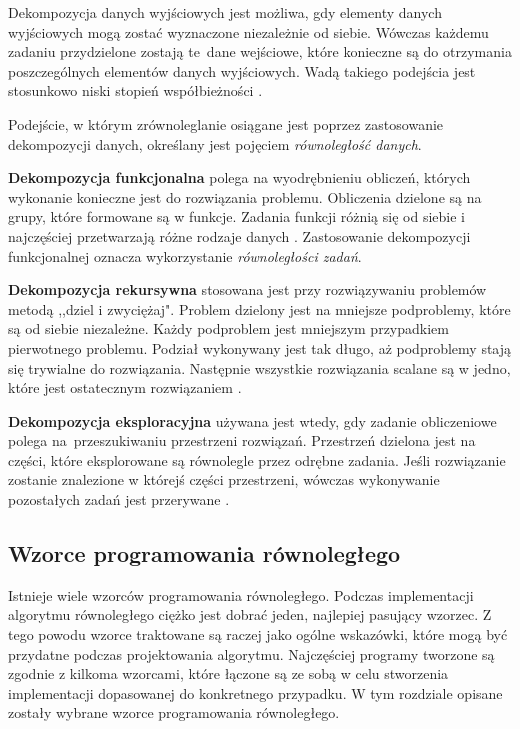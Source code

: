 \documentclass[12pt]{article}
\begin{document}
Dekompozycja danych wyjściowych jest możliwa, gdy elementy danych wyjściowych mogą zostać wyznaczone niezależnie od siebie.
Wówczas każdemu zadaniu przydzielone zostają te~dane wejściowe, które konieczne są do otrzymania poszczególnych elementów
danych wyjściowych. Wadą takiego podejścia jest stosunkowo niski stopień współbieżności \cite{wprowadzenie-do-obliczen-rownoleglych}.

Podejście, w którym zrównoleglanie osiągane jest poprzez zastosowanie dekompozycji danych, określany jest pojęciem
\textit{równoległość danych}. 

\textbf{Dekompozycja funkcjonalna} polega na wyodrębnieniu obliczeń, których wykonanie konieczne jest do rozwiązania problemu. Obliczenia dzielone są
na grupy, które formowane są w funkcje. Zadania funkcji różnią się od siebie i najczęściej przetwarzają różne rodzaje danych
\cite{wprowadzenie-do-obliczen-rownoleglych}.
Zastosowanie dekompozycji funkcjonalnej oznacza wykorzystanie \textit{równoległości zadań}.

\textbf{Dekompozycja rekursywna} stosowana jest przy rozwiązywaniu problemów metodą ,,dziel i zwyciężaj". Problem dzielony jest na
mniejsze podproblemy, które są od siebie niezależne. Każdy podproblem jest mniejszym przypadkiem pierwotnego problemu. Podział
wykonywany jest tak długo, aż podproblemy stają się trywialne do rozwiązania. Następnie wszystkie rozwiązania scalane są w jedno,
które jest ostatecznym rozwiązaniem \cite{wprowadzenie-do-obliczen-rownoleglych}.

\textbf{Dekompozycja eksploracyjna} używana jest wtedy, gdy zadanie obliczeniowe polega na~przeszukiwaniu przestrzeni rozwiązań. Przestrzeń dzielona
jest na części, które eksplorowane są równolegle przez odrębne zadania. Jeśli rozwiązanie zostanie znalezione w którejś części przestrzeni,
wówczas wykonywanie pozostałych zadań jest przerywane \cite{wprowadzenie-do-obliczen-rownoleglych}.

\subsection{Wzorce programowania równoległego}
Istnieje wiele wzorców programowania równoległego. Podczas implementacji algorytmu równoległego ciężko jest dobrać jeden, najlepiej pasujący wzorzec.
Z tego powodu wzorce traktowane są raczej jako ogólne wskazówki, które mogą być przydatne podczas projektowania algorytmu. Najczęściej programy
tworzone są zgodnie z kilkoma wzorcami, które łączone są ze sobą w celu stworzenia implementacji dopasowanej do konkretnego przypadku.
W tym rozdziale opisane zostały wybrane wzorce programowania równoległego.
\end{document}
